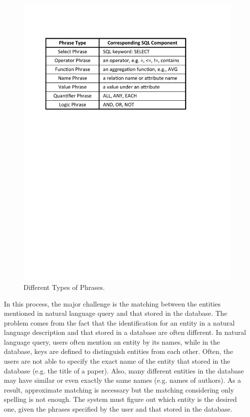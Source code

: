 \documentclass{vldb}
\begin{document}
\begin{figure}
  \center
  \includegraphics[width=0.85\linewidth]{pic/nodeType.pdf}
  \caption{Different Types of Phrases.}
  \label{fig:nodeType}
\end{figure}

In this process, the major challenge is the matching between the entities mentioned in natural language query and that stored in the database. The problem comes from the fact that the identification for an entity in a natural language description and that stored in a database are often different. In natural language query, users often mention an entity by its names, while in the database, keys are defined to distinguish entities from each other. Often, the users are not able to specify the exact name of the entity that stored in the database (e.g. the title of a paper). Also, many different entities in the database may have similar or even exactly the same names (e.g. names of authors). As a result, approximate matching is necessary but the matching considering only spelling is not enough. The system must figure out which entity is the desired one, given the phrases specified by the user and that stored in the database.
\end{document}
